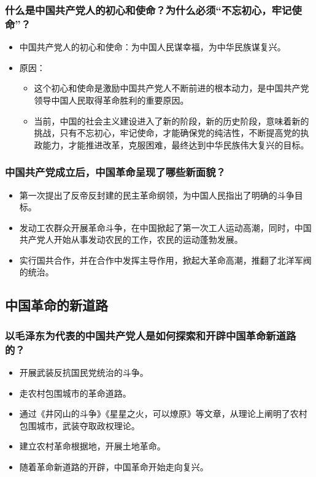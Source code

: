 \documentclass{article}
\begin{document}
\subsubsection{什么是中国共产党人的初心和使命？为什么必须“不忘初心，牢记使命”？}
\begin{itemize}
    \item 中国共产党人的初心和使命：为中国人民谋幸福，为中华民族谋复兴。
    \item 原因：
    \begin{itemize}
        \item 这个初心和使命是激励中国共产党人不断前进的根本动力，是中国共产党领导中国人民取得革命胜利的重要原因。
        \item 当前，中国的社会主义建设进入了新的阶段，新的历史阶段，意味着新的挑战，只有不忘初心，牢记使命，才能确保党的纯洁性，不断提高党的执政能力，才能推进改革，克服困难，最终达到中华民族伟大复兴的目标。
    \end{itemize}
\end{itemize}

\subsubsection{中国共产党成立后，中国革命呈现了哪些新面貌？}
\begin{itemize}
    \item 第一次提出了反帝反封建的民主革命纲领，为中国人民指出了明确的斗争目标。
    \item 发动工农群众开展革命斗争，在中国掀起了第一次工人运动高潮，同时，中国共产党人开始从事发动农民的工作，农民的运动蓬勃发展。
    \item 实行国共合作，并在合作中发挥主导作用，掀起大革命高潮，推翻了北洋军阀的统治。
\end{itemize}

\subsection{中国革命的新道路}

\subsubsection{以毛泽东为代表的中国共产党人是如何探索和开辟中国革命新道路的？}
\begin{itemize}
    \item 开展武装反抗国民党统治的斗争。
    \item 走农村包围城市的革命道路。
    \item 通过《井冈山的斗争》《星星之火，可以燎原》等文章，从理论上阐明了农村包围城市，武装夺取政权理论。
    \item 建立农村革命根据地，开展土地革命。
    \item 随着革命新道路的开辟，中国革命开始走向复兴。
\end{itemize}
    
\end{document}
